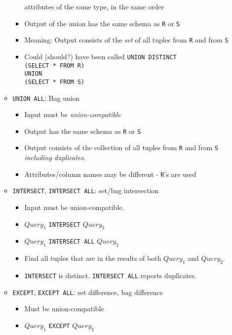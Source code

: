 \documentclass[landscape,8pt]{extarticle}
\newcommand{\code}{\lstinline}
\begin{document}
\begin{multicols}{4}
\begin{itemize}
\begin{itemize}
\begin{itemize}
            attributes of the same type, in the same order
            \item Output of the union has the same schema as \code{R} or \code{S}
            \item Meaning: Output consists of the \emph{set} of all tuples from \code{R} and from \code{S}
            \item Could (should?) have been called \code{UNION DISTINCT} \\
            \code{(SELECT * FROM R)} \\
            \code{UNION} \\
            \code{(SELECT * FROM S)} \\
        \end{itemize}
        \item \code{UNION ALL}: Bag union
        \begin{itemize}
            \item Input must be \emph{union-compatible}
            \item Output has the same schema as \code{R} or \code{S}
            \item Output consists of the collection of all tuples from \code{R} and from \code{S} \emph{including duplicates}.
            \item Attributes/column names may be different - \code{R}'s are used
        \end{itemize}
        \item \code{INTERSECT}, \code{INTERSECT ALL}: set/bag intersection
        \begin{itemize}
            \item Input must be union-compatible.
            \item $Query_1$ \code{INTERSECT} $Query_2$ 
            \item $Query_1$ \code{INTERSECT ALL} $Query_2$
            \item Find all tuples that are in the results of both $Query_1$ and $Query_2$.
            \item \code{INTERSECT} is distinct. \code{INTERSECT ALL} reports duplicates.
        \end{itemize}
        \item \code{EXCEPT}, \code{EXCEPT ALL}: set difference, bag difference
        \begin{itemize}
            \item Must be union-compatible
            \item $Query_1$ \code{EXCEPT} $Query_2$

\end{itemize}
\end{itemize}
\end{itemize}
\end{multicols}
\end{document}
